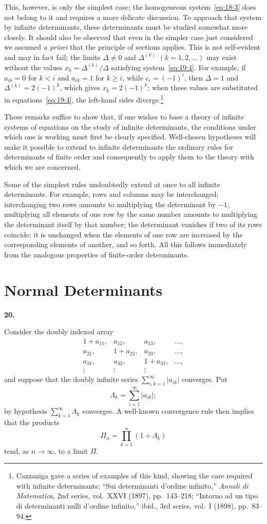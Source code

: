 \documentclass[
  paper=b5,
  fontsize=13pt,
  twoside=true,
  open=any,
  bookmarkpackage=false,
  chapterprefix=true,
  headings=normal
]{scrbook}
\theoremstyle{definition}
\newcommand{\numberedparagraph}[1]{%
  \par\medskip\phantomsection\label{sec:#1}%
  \noindent\textbf{#1.}\enspace
}
\begin{document}
This, however, is only the simplest case; the homogeneous system~\eqref{eq:18:3} does not belong to it and requires a more delicate discussion. To approach that system by infinite determinants, these determinants must be studied somewhat more closely. It should also be observed that even in the simpler case just considered we assumed \emph{a priori} that the principle of sections applies. This is not self-evident and may in fact fail; the limits $\Delta\ne0$ and $\Delta^{(k)}$ $(k=1,2,\ldots)$ may exist without the values $x_k=\Delta^{(k)}/\Delta$ satisfying system~\eqref{eq:19:4}. For example, if $a_{ik}=0$ for $k<i$ and $a_{ik}=1$ for $k\geq i$, while $c_i=(-1)^i$, then $\Delta=1$ and $\Delta^{(k)}=2(-1)^k$, which gives $x_k=2(-1)^k$; when these values are substituted in equations~\eqref{eq:19:4}, the left-hand sides diverge.\footnote{Cazzaniga gave a series of examples of this kind, showing the care required with infinite determinants: ``Sui determinanti d'ordine infinito,'' \emph{Annali di Matematica}, 2nd series, vol.~XXVI (1897), pp.~143--218; ``Intorno ad un tipo di determinanti nulli d'ordine infinito,'' ibid., 3rd series, vol.~I (1898), pp.~83--94.}

These remarks suffice to show that, if one wishes to base
a theory of infinite systems of equations on the study of infinite determinants, the conditions under which one is working must first be clearly specified. Well-chosen hypotheses will make it possible to extend to infinite determinants the ordinary rules for determinants of finite order and consequently to apply them to the theory with which we are concerned.

Some of the simplest rules undoubtedly extend at once to all infinite determinants. For example, rows and columns may be interchanged; interchanging two rows amounts to multiplying the determinant by $-1$; multiplying all elements of one row by the same number amounts to multiplying the determinant itself by that number; the determinant vanishes if two of its rows coincide; it is unchanged when the elements of one row are increased by the corresponding elements of another, and so forth. All this follows immediately from the analogous properties of finite-order determinants.

\section{Normal Determinants}

\numberedparagraph{20}
Consider the doubly indexed array
\[
\begin{matrix}
  1+a_{11},&a_{12},&a_{13},&\ldots,\\
  a_{21},&1+a_{22},&a_{23},&\ldots,\\
  a_{31},&a_{32},&1+a_{33},&\ldots,\\
  \vdots&\vdots&\vdots&
\end{matrix}
\]
and suppose that the doubly infinite series $\sum_{i,k=1}^{\infty}|a_{ik}|$ converges. Put
\[
  \Lambda_k=\sum_{i=1}^{\infty}|a_{ik}|;
\]
by hypothesis $\sum_{k=1}^{\infty}\Lambda_k$ converges. A well-known convergence rule then implies that the products
\[
  \Pi_n=\prod_{k=1}^{n}(1+\Lambda_k)
\]
tend, as $n\to\infty$, to a limit $\Pi$.
\end{document}
